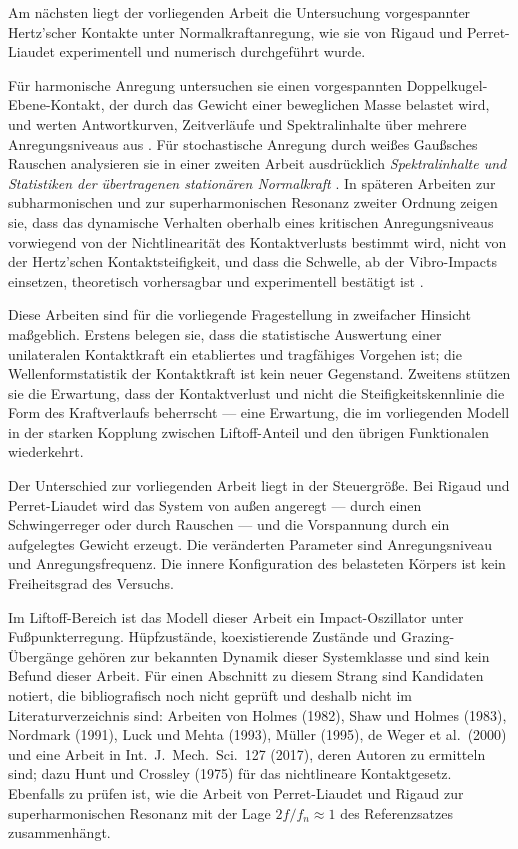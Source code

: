 \documentclass[12pt,a4paper]{report}
\begin{document}
Am nächsten liegt der vorliegenden Arbeit die Untersuchung
vorgespannter Hertz'scher Kontakte unter Normalkraftanregung, wie sie
von Rigaud und Perret-Liaudet experimentell und numerisch durchgeführt
wurde.

Für harmonische Anregung untersuchen sie einen vorgespannten
Doppelkugel-Ebene-Kontakt, der durch das Gewicht einer beweglichen Masse
belastet wird, und werten Antwortkurven, Zeitverläufe und
Spektralinhalte über mehrere Anregungsniveaus aus \cite{rigaud2003}. Für
stochastische Anregung durch weißes Gaußsches Rauschen analysieren sie
in einer zweiten Arbeit ausdrücklich \emph{Spektralinhalte und
Statistiken der übertragenen stationären Normalkraft}
\cite{perretliaudet2003}. In späteren Arbeiten zur subharmonischen und zur superharmonischen
Resonanz zweiter Ordnung zeigen sie, dass das dynamische Verhalten
oberhalb eines kritischen Anregungsniveaus vorwiegend von der
Nichtlinearität des Kontaktverlusts bestimmt wird, nicht von der
Hertz'schen Kontaktsteifigkeit, und dass die Schwelle, ab der
Vibro-Impacts einsetzen, theoretisch vorhersagbar und experimentell
bestätigt ist \cite{perretliaudet2006, perretliaudet2007}.

Diese Arbeiten sind für die vorliegende Fragestellung in zweifacher
Hinsicht maßgeblich. Erstens belegen sie, dass die statistische
Auswertung einer unilateralen Kontaktkraft ein etabliertes und
tragfähiges Vorgehen ist; die Wellenformstatistik der Kontaktkraft ist
kein neuer Gegenstand. Zweitens stützen sie die Erwartung, dass der
Kontaktverlust und nicht die Steifigkeitskennlinie die Form des
Kraftverlaufs beherrscht --- eine Erwartung, die im vorliegenden Modell
in der starken Kopplung zwischen Liftoff-Anteil und den übrigen
Funktionalen wiederkehrt.

Der Unterschied zur vorliegenden Arbeit liegt in der Steuergröße. Bei
Rigaud und Perret-Liaudet wird das System von außen angeregt --- durch
einen Schwingerreger oder durch Rauschen --- und die Vorspannung durch
ein aufgelegtes Gewicht erzeugt. Die veränderten Parameter sind
Anregungsniveau und Anregungsfrequenz. Die innere Konfiguration des
belasteten Körpers ist kein Freiheitsgrad des Versuchs.

Im Liftoff-Bereich ist das Modell dieser Arbeit ein Impact-Oszillator
unter Fußpunkterregung. Hüpfzustände, koexistierende Zustände und
Grazing-Übergänge gehören zur bekannten Dynamik dieser Systemklasse und
sind kein Befund dieser Arbeit. Für einen Abschnitt zu diesem Strang sind
Kandidaten notiert, die bibliografisch noch nicht geprüft und deshalb
nicht im Literaturverzeichnis sind: Arbeiten von Holmes (1982), Shaw und
Holmes (1983), Nordmark (1991), Luck und Mehta (1993), Müller (1995),
de Weger et al.\ (2000) und eine Arbeit in Int.\ J.\ Mech.\ Sci.\ 127
(2017), deren Autoren zu ermitteln sind; dazu Hunt und Crossley (1975)
für das nichtlineare Kontaktgesetz. Ebenfalls zu prüfen ist, wie die
Arbeit von Perret-Liaudet und Rigaud zur superharmonischen Resonanz
\cite{perretliaudet2007} mit der Lage $2f/f_n \approx 1$ des
Referenzsatzes zusammenhängt.
\end{document}
